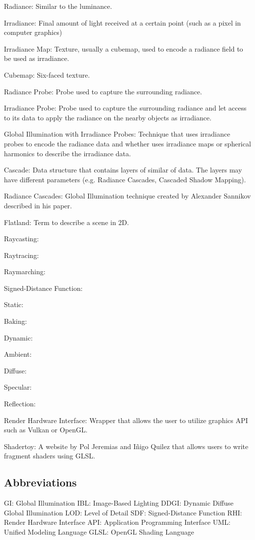 \documentclass{rapportCS}
\begin{document}
Radiance: Similar to the luminance.

Irradiance: Final amount of light received at a certain point (such as a pixel in computer graphics)

Irradiance Map: Texture, usually a cubemap, used to encode a radiance field to be used as irradiance.

Cubemap: Six-faced texture.

Radiance Probe: Probe used to capture the surrounding radiance.

Irradiance Probe: Probe used to capture the surrounding radiance and let access to its data to apply the radiance on the nearby objects as irradiance.

Global Illumination with Irradiance Probes: Technique that uses irradiance probes to encode the radiance data and whether uses irradiance maps or spherical harmonics to describe the irradiance data.

Cascade: Data structure that contains layers of similar of data. The layers may have different parameters (e.g. Radiance Cascades, Cascaded Shadow Mapping).

Radiance Cascades: Global Illumination technique created by Alexander Sannikov described in his paper.

Flatland: Term to describe a scene in 2D.

Raycasting:

Raytracing:

Raymarching:

Signed-Distance Function:

Static:

Baking:

Dynamic:

Ambient:

Diffuse:

Specular:

Reflection:

Render Hardware Interface: Wrapper that allows the user to utilize graphics API such as Vulkan or OpenGL.

Shadertoy: A website by Pol Jeremias and Iñigo Quilez that allows users to write fragment shaders using GLSL.

\subsection*{Abbreviations}

GI: Global Illumination
IBL: Image-Based Lighting
DDGI: Dynamic Diffuse Global Illumination
LOD: Level of Detail
SDF: Signed-Distance Function
RHI: Render Hardware Interface
API: Application Programming Interface
UML: Unified Modeling Language
GLSL: OpenGL Shading Language
\end{document}

